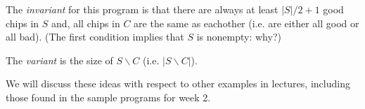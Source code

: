 \documentclass[twoside=false,DIV=14]{scrartcl}
\begin{document}
The \emph{invariant} for this program is that there are always at least $|S|/2+1$ good chips in $S$  and, all chips in $C$ are the same as eachother (i.e. are either all good or all bad). (The first condition implies that $S$ is nonempty: why?)

The \emph{variant} is the size of $S\backslash C$ (i.e. $|S\backslash C|$).

We will discuss these ideas with respect to other examples in lectures, including those found in the sample programs for week 2.


\end{document}
